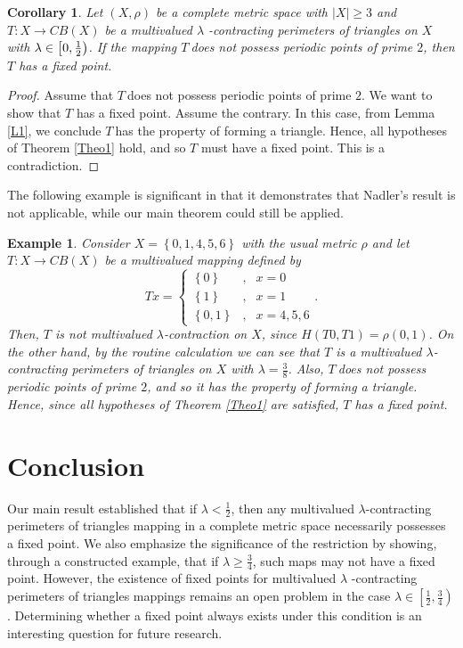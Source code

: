 \documentclass[reqno,11pt]{amsart}
\theoremstyle{plain}
\newtheorem{corollary}{Corollary}
\newtheorem{example}{Example}
\numberwithin{equation}{section}
\begin{document}
\begin{corollary}
Let $\left( X,\rho \right) $ be a complete metric space with $\left \vert
X\right \vert \geq 3$ and $T:X\rightarrow CB(X)$ be a multivalued $\lambda $%
-contracting perimeters of triangles on $X$ with $\lambda \in \left[ 0,\frac{%
1}{2}\right) $. If the mapping $T~$does not possess periodic points of prime 
$2$, then $T$ has a fixed point.
\end{corollary}

\begin{proof}
Assume that $T~$does not possess periodic points of prime $2$. We want to
show that $T$ has a fixed point. Assume the contrary. In this case, from
Lemma \ref{L1}, we conclude $T~$has the property of forming a triangle.
Hence, all hypotheses of Theorem \ref{Theo1} hold, and so $T$ must have a
fixed point. This is a contradiction.
\end{proof}

The following example is significant in that it demonstrates that Nadler's
result is not applicable, while our main theorem could still be applied.

\begin{example}
Consider $X=\left \{ 0,1,4,5,6\right \} $ with the usual metric $\rho $ and
let $T:X\rightarrow CB(X)$ be a multivalued mapping defined by%
\begin{equation*}
Tx=\left \{ 
\begin{array}{ccc}
\left \{ 0\right \} & , & x=0 \\ 
\left \{ 1\right \} & , & x=1 \\ 
\left \{ 0,1\right \} & , & x=4,5,6%
\end{array}%
\right. .
\end{equation*}%
Then, $T$ is not multivalued $\lambda $-contraction on $X$, since $%
H(T0,T1)=\rho (0,1)$. On the other hand, by the routine calculation we can
see that $T$ is a multivalued $\lambda $-contracting perimeters of triangles
on $X$ with $\lambda =\frac{3}{8}$. Also, $T~$does not possess periodic
points of prime $2$, and so it has the property of forming a triangle.
Hence, since all hypotheses of Theorem \ref{Theo1} are satisfied, $T$ has a
fixed point.
\end{example}

\section{Conclusion}

Our main result established that if $\lambda <\frac{1}{2}$, then any
multivalued $\lambda $-contracting perimeters of triangles mapping in a
complete metric space necessarily possesses a fixed point. We also emphasize
the significance of the restriction by showing, through a constructed
example, that if $\lambda \geq \frac{3}{4}$, such maps may not have a fixed
point. However, the existence of fixed points for multivalued $\lambda $%
-contracting perimeters of triangles mappings remains an open problem in the
case $\lambda \in \left[ \frac{1}{2},\frac{3}{4}\right) $. Determining
whether a fixed point always exists under this condition is an interesting
question for future research.
\end{document}
